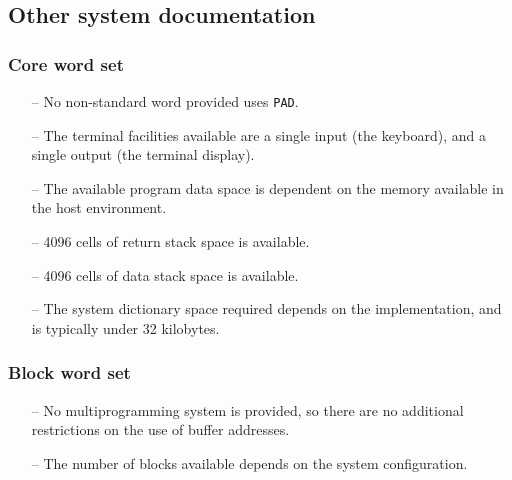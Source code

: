 \documentclass[english]{article}
\begin{document}
\subsection{Other system documentation}

\subsubsection{Core word set}

\begin{itemize}
\item[--]No non-standard word provided uses {\tt PAD}.
\item[--]The terminal facilities available are a single input (the keyboard), and a single output (the terminal display).
\item[--]The available program data space is dependent on the memory available in the host environment.
\item[--]4096 cells of return stack space is available.
\item[--]4096 cells of data stack space is available.
\item[--]The system dictionary space required depends on the implementation, and is typically under 32 kilobytes.
\end{itemize}

\subsubsection{Block word set}

\begin{itemize}
\item[--]No multiprogramming system is provided, so there are no additional restrictions on the use of buffer addresses.
\item[--]The number of blocks available depends on the system configuration.
\end{itemize}




\end{document}
